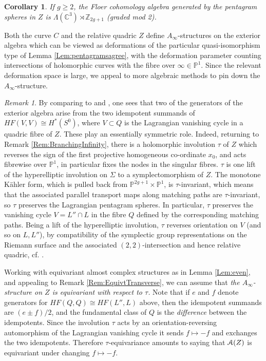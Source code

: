 \documentclass[reqno,10pt]{amsart}
\numberwithin{equation}{section}
\newcommand{\bC}{{\mathbb C}}
\newcommand{\bP}{{\mathbb P}}
\newcommand{\bZ}{{\mathbb Z}}
\newcommand{\scrA}{\EuScript{A}}
\newtheorem{Corollary}[thm]{Corollary}
\theoremstyle{remark}
\newtheorem{Remark}[thm]{Remark}
\begin{document}



\begin{Corollary} \label{Cor:PentsEqual}
If $g\geq 2$, the Floer cohomology algebra generated by the pentagram spheres in $Z$ is $\Lambda(\bC^3) \rtimes \bZ_{2g+1}$ (graded mod 2).
\end{Corollary} 

Both the curve $C$ and the relative quadric $Z$ define $A_{\infty}$-structures on the exterior algebra which can be viewed as deformations of the particular quasi-isomorphism type of Lemma \ref{Lem:pentagramsagree}, with the deformation parameter counting intersections of holomorphic curves with the fibre over $\infty \in \bP^1$.  Since the relevant deformation space is large, we appeal to more algebraic methods to pin down the $A_{\infty}$-structure.

\begin{Remark} \label{Rem:TwoVblesNeeded}
By comparing to \cite{Seidel:HMSgenus2} and \cite{Efimov}, one sees that two of the generators of the exterior algebra arise from the two idempotent summands of $HF(V,V) \cong H^*(S^0)$, where $V \subset Q$ is the Lagrangian vanishing cycle in a  quadric fibre of $Z$. These play an essentially symmetric role.  Indeed, returning to Remark \ref{Rem:BranchingInfinity}, there is a holomorphic involution $\tau$ of $Z$ which reverses the sign of the first projective homogeneous co-ordinate $x_0$, and acts fibrewise over $\bP^1$, in particular fixes the nodes in the singular fibres. $\tau$ is one lift of the hyperelliptic involution on $\Sigma$ to a symplectomorphism of $Z$.  The  monotone K\"ahler form, which is pulled back from $\bP^{2g+1} \times \bP^1$, is $\tau$-invariant, which means that the associated parallel transport maps along matching paths are $\tau$-invariant, so $\tau$ preserves the Lagrangian pentagram spheres.  In particular, $\tau$ preserves the vanishing cycle $V = L'' \cap L$ in the fibre $Q$ defined by the corresponding matching paths.  Being a lift of the hyperelliptic involution, $\tau$ reverses orientation on $V$ (and so on $L, L''$),  by compatibility of the symplectic group representations on the Riemann surface and the associated $(2,2)$-intersection and hence relative quadric, cf. \cite{Reid}. 

Working with equivariant almost complex structures as in Lemma \ref{Lem:even}, and appealing to Remark \ref{Rem:EquivtTransverse}, we can assume that \emph{the $A_{\infty}$-structure on $Z$ is equivariant with respect to $\tau$.}  Note that if $e$ and $f$ denote generators for $HF(Q,Q) \cong HF(L'', L)$ above, then the idempotent summands are $(e\pm f)/2$, and the fundamental class of $Q$ is the \emph{difference} between the idempotents.  Since the involution $\tau$ acts by an orientation-reversing automorphism of the Lagrangian vanishing cycle it sends $f\mapsto -f$ and exchanges the two idempotents.   Therefore $\tau$-equivariance amounts to saying that $\scrA(Z)$ is equivariant under changing $f\mapsto -f$.   
\end{Remark}
\end{document}

